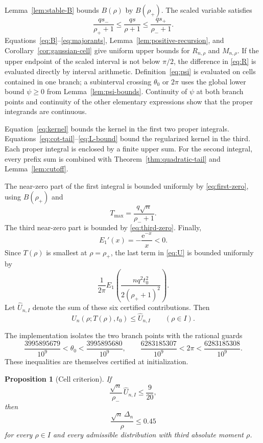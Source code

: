 \documentclass[11pt,a4paper,twoside]{article}
\newcommand{\manualtag}[1]{\tag{#1}}
\newtheorem{proposition}[theorem]{Proposition}
\theoremstyle{remark}
\newcommand{\e}{\mathrm{e}}
\newcommand{\Uhat}{\widehat U}
\begin{document}
Lemma~\ref{lem:stable-B} bounds \(B(\rho)\) by \(B(\rho_+)\).
The scaled variable satisfies
\[
 \frac{qs_-}{\rho_++1}
 \le
 \frac{qs}{\rho+1}
 \le
 \frac{qs_+}{\rho_-+1}.
\]
Equations~\eqref{eq:B}--\eqref{eq:majorants},
Lemma~\ref{lem:positive-recursion}, and
Corollary~\ref{cor:gaussian-cell} give uniform upper bounds for
\(R_{n,\rho}\) and \(M_{n,\rho}\).  If the upper endpoint of the
scaled interval is not below \(\pi/2\), the difference in \eqref{eq:R}
is evaluated directly by interval arithmetic.  Definition~\eqref{eq:psi}
is evaluated on cells contained in one branch; a subinterval crossing
\(\theta_0\) or \(2\pi\) uses the global lower bound
\(\psi\ge0\) from Lemma~\ref{lem:psi-bounds}.  Continuity of \(\psi\)
at both branch points and continuity of the other elementary expressions
show that the proper integrands are continuous.

Equation~\eqref{eq:kernel} bounds the kernel in the first two proper
integrals.  Equations~\eqref{eq:cot-tail}--\eqref{eq:L-bound} bound the
regularized kernel in the third.  Each proper integral is enclosed by a
finite upper sum.  For the second integral, every prefix sum is combined
with Theorem~\ref{thm:quadratic-tail} and Lemma~\ref{lem:cutoff}.

The near-zero part of the first integral is bounded uniformly by
\eqref{eq:first-zero}, using \(B(\rho_+)\) and
\[
 T_{\max}=\frac{q\sqrt n}{\rho_-+1}.
\]
The third near-zero part is bounded by \eqref{eq:third-zero}.
Finally,
\[
 E_1'(x)=-\frac{\e^{-x}}x<0.
\]
Since \(T(\rho)\) is smallest at \(\rho=\rho_+\), the last term in
\eqref{eq:U} is bounded uniformly by
\[
 \frac1{2\pi}
 E_1\!\left(
  \frac{nq^2t_0^2}{2(\rho_++1)^2}
 \right).
\]
Let \(\Uhat_{n,I}\) denote the sum of these six certified
contributions.  Then
\[
 U_n(\rho;T(\rho),t_0)\le\Uhat_{n,I}
 \qquad(\rho\in I).
\]

The implementation isolates the two branch points with the rational guards
\[
 \frac{3995895679}{10^9}<\theta_0<
 \frac{3995895680}{10^9},
 \qquad
 \frac{6283185307}{10^9}<2\pi<
 \frac{6283185308}{10^9}.
\]
These inequalities are themselves certified at initialization.

\begin{proposition}[Cell criterion]\label{prop:cell-criterion}
If
\begin{equation}
 \frac{\sqrt n}{\rho_-}\,\Uhat_{n,I}
 \le\frac9{20},
 \manualtag{35}\label{eq:cell-criterion}
\end{equation}
then
\[
 \frac{\sqrt n\,\Delta_n}{\rho}\le0.45
\]
for every \(\rho\in I\) and every admissible distribution with third
absolute moment \(\rho\).
\end{proposition}
\end{document}
